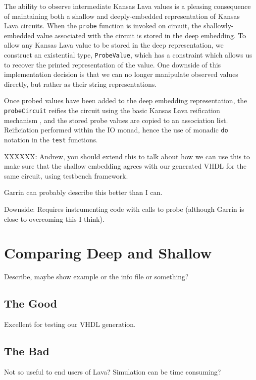 \documentclass{llncs}
\begin{document}
The ability to observe intermediate Kansas Lava values is a pleasing consequence
of maintaining both a shallow and deeply-embedded representation of Kansas Lava
circuits. When the \verb!probe! function is invoked on circuit, the
shallowly-embedded value associated with the circuit is stored in the deep
embedding. To allow any Kansas Lava value to be stored in the deep
representation, we construct an existential type, \verb!ProbeValue!, which has a
constraint which allows us to recover the printed representation of the
value. One downside of this implementation decision is that we can no longer
manipulate observed values directly, but rather as their string representations.

Once probed values have been added to the deep embedding representation, the
\verb!probeCircuit! reifies the circuit using the basic Kansas Lava reification
mechanism \cite{}, and the stored probe values are copied to an association
list. Reificiation performed within the IO monad, hence the use of monadic \verb!do!
notation in the \verb!test! functions.

XXXXXX: Andrew, you should extend this to talk about how we can use this to
make sure that the shallow embedding agrees with our generated VHDL for the same
circuit, using testbench framework.


Garrin can probably describe this better than I can.

Downside: Requires instrumenting code with calls to probe (although Garrin is close to
overcoming this I think).

\section{Comparing Deep and Shallow}

Describe, maybe show example or the info file or something?

\subsection{The Good}

Excellent for testing our VHDL generation.

\subsection{The Bad}

Not so useful to end users of Lava? Simulation can be time consuming?

\end{document}
